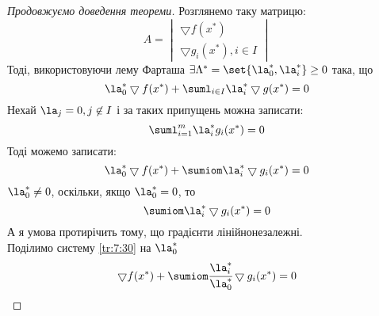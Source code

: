 \begin{proof}[Продовжуємо доведення теореми]
Розглянемо таку матрицю:
\begin{equation}
	A = \begin{vmatrix}
		\bigtriangledown f(x^\ast) \\ \bigtriangledown g_i(x^\ast),i\in I
	\end{vmatrix}
\end{equation}
Тоді, використовуючи лему Фарташа $\exists \Lambda^\ast = \set{\la^\ast_0,\la^\ast_i}\geq 0$ така, що
\begin{equation}
	\la^\ast_0 
	\bigtriangledown 
	f(x^\ast) + \suml_{i\in I} \la^\ast_i \bigtriangledown g(x^\ast) = 0
\end{equation}
Нехай $\la_j=0,j\not\in I$ і за таких припущень можна записати:
\begin{equation}
	\suml_{i=1}^m \la_i^\ast g_i(x^\ast) = 0 
\end{equation}
Тоді можемо записати:
\begin{equation}\label{tr:7:30}
	\la^\ast_0 \bigtriangledown f(x^\ast) + \sumiom \la_i^\ast \bigtriangledown g_i(x^\ast) = 0 
\end{equation} 
$\la_0^\ast \neq0$, оскільки, якщо $\la^\ast_0=0$, то
\begin{equation}
	\sumiom \la_i^\ast \bigtriangledown g_i(x^\ast) = 0
\end{equation}
А я умова протирічить тому, що градієнти лінійнонезалежні.\\
Поділимо систему \eqref{tr:7:30} на $\la^\ast_0$
\begin{equation}
	\bigtriangledown f(x^\ast) + \sumiom \cfrac{\la_i^\ast}{\la_0^\ast} \bigtriangledown g_i(x^\ast) = 0 
\end{equation}
\end{proof}
